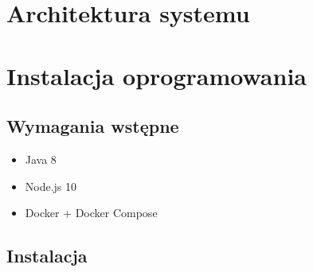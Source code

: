 \section{Architektura systemu}\label{sec:system-architecture}
\section{Instalacja oprogramowania}\label{sec:software-installation}
\subsection{Wymagania wstępne}\label{subsec:prerequirements}
\begin{itemize}
    \item Java 8\cite{tech:java}
    \item Node.js 10\cite{tech:nodejs}
    \item Docker\cite{tech:docker} + Docker Compose\cite{tech:docker-compose}
\end{itemize}
\subsection{Instalacja}\label{subsec:installation}

